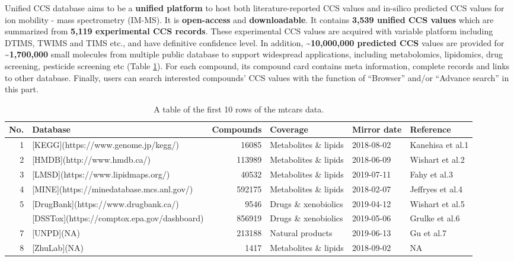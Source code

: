 \documentclass[12pt,]{book}
\theoremstyle{definition}
\theoremstyle{definition}
\theoremstyle{definition}
\theoremstyle{remark}
\begin{document}
Unified CCS database aims to be a \textbf{unified platform} to host both
literature-reported CCS values and in-silico predicted CCS values for
ion mobility - mass spectrometry (IM-MS). It is \textbf{open-access} and
\textbf{downloadable}. It contains \textbf{3,539 unified CCS values}
which are summarized from \textbf{5,119 experimental CCS records}. These
experimental CCS values are acquired with variable platform including
DTIMS, TWIMS and TIMS etc., and have definitive confidence level. In
addition, \textbf{\textasciitilde{}10,000,000 predicted CCS} values are
provided for \textbf{\textasciitilde{}1,700,000} small molecules from
multiple public database to support widespread applications, including
metabolomics, lipidomics, drug screening, pesticide screening etc (Table
\ref{tab:dbinfo}). For each compound, its compound card contains meta
information, complete records and links to other database. Finally,
users can search interested compounds' CCS values with the function of
``Browser'' and/or ``Advance search'' in this part.

\begin{table}

\caption{\label{tab:dbinfo}A table of the first 10 rows of the mtcars data.}
\centering
\begin{tabular}[t]{rlrlll}
\toprule
No. & Database & Compounds & Coverage & Mirror date & Reference\\
\midrule
1 & [KEGG](https://www.genome.jp/kegg/) & 16085 & Metabolites \& lipids & 2018-08-02 & Kanehisa et al.1\\
2 & [HMDB](http://www.hmdb.ca/) & 113989 & Metabolites \& lipids & 2018-06-09 & Wishart et al.2\\
3 & [LMSD](https://www.lipidmaps.org/) & 40532 & Metabolites \& lipids & 2019-07-11 & Fahy et al.3\\
4 & [MINE](https://minedatabase.mcs.anl.gov/) & 592175 & Metabolites \& lipids & 2018-02-07 & Jeffryes et al.4\\
5 & [DrugBank](https://www.drugbank.ca/) & 9546 & Drugs \& xenobiolics & 2019-04-12 & Wishart et al.5\\
\addlinespace
6 & [DSSTox](https://comptox.epa.gov/dashboard) & 856919 & Drugs \& xenobiolics & 2019-05-06 & Grulke et al.6\\
7 & [UNPD](NA) & 213188 & Natural products & 2019-06-13 & Gu et al.7\\
8 & [ZhuLab](NA) & 1417 & Metabolites \& lipids & 2018-09-02 & NA\\
\bottomrule
\end{tabular}
\end{table}
\end{document}
